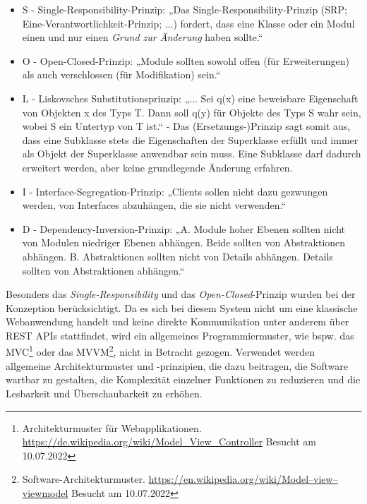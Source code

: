     \begin{itemize}
        \item S - Single-Responsibility-Prinzip: „Das Single-Responsibility-Prinzip (SRP; Eine-Verantwortlichkeit-Prinzip; ...) fordert, dass eine Klasse oder ein Modul einen und nur einen \textit{Grund zur Änderung} haben sollte.“ \cite{cleancode2009}
        \item O - Open-Closed-Prinzip: „Module sollten sowohl offen (für Erweiterungen) als auch verschlossen (für Modifikation) sein.“ \cite{ocpmeyer1988}
        \item L - Liskovsches Substitutionsprinzip: „... Sei q(x) eine beweisbare Eigenschaft von Objekten x des Typs T. Dann soll q(y) für Objekte des Typs S wahr sein, wobei S ein Untertyp von T ist.“ \cite{liskov2001behavioral} - Das (Ersetzungs-)Prinzip sagt somit aus, dass eine 
        Subklasse stets die Eigenschaften der Superklasse erfüllt und immer als Objekt der Superklasse anwendbar sein muss. Eine Subklasse darf dadurch erweitert werden, aber 
        keine grundlegende Änderung erfahren. 
        \item I - Interface-Segregation-Prinzip: „Clients sollen nicht dazu gezwungen werden, von Interfaces abzuhängen, die sie nicht verwenden.“ \cite{martin1996interface}
        \item D - Dependency-Inversion-Prinzip: „A. Module hoher Ebenen sollten nicht von Modulen niedriger Ebenen abhängen. Beide sollten von Abstraktionen abhängen. B. Abstraktionen sollten nicht von Details abhängen. Details sollten von Abstraktionen abhängen.“ \cite{martin2003agile}
    \end{itemize}
    Besonders das \textit{Single-Responsibility} und das \textit{Open-Closed}-Prinzip wurden bei der Konzeption berücksichtigt. 
    Da es sich bei diesem System nicht um eine klassische 
    Webanwendung handelt und keine direkte Kommunikation unter anderem über \acs{REST} \acs{API}s stattfindet, wird ein allgemeines 
    Programmiermuster, wie bspw. das \ac{MVC}\footnote{Architekturmuster für Webapplikationen. \url{https://de.wikipedia.org/wiki/Model_View_Controller} Besucht am 10.07.2022} 
    oder das \ac{MVVM}\footnote{Software-Architekturmuster. \url{https://en.wikipedia.org/wiki/Model–view–viewmodel} Besucht am 10.07.2022 }, nicht 
    in Betracht gezogen. Verwendet werden allgemeine Architekturmuster und -prinzipien, die dazu beitragen, die Software wartbar 
    zu gestalten, die Komplexität einzelner Funktionen zu reduzieren und die Lesbarkeit und Überschaubarkeit zu erhöhen. 
    \pagebreak
